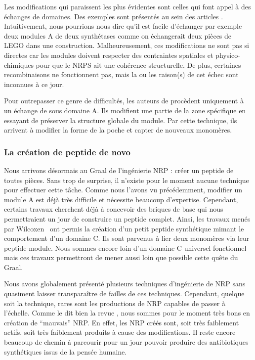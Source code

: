 Les modifications qui paraissent les plus évidentes sont celles qui font appel à des échanges de domaines.
Des exemples sont présentés au sein des articles \cite{cane_harnessing_1998,kim_reinvigorating_2015}.
Intuitivement, nous pourrions nous dire qu'il est facile d'échanger par exemple deux modules A de deux synthétases comme on échangerait deux pièces de LEGO dans une construction.
Malheureusement, ces modifications ne sont pas si directes car les modules doivent respecter des contraintes spatiales et physico-chimiques pour que le NRPS ait une cohérence structurelle.
De plus, certaines recombinaisons ne fonctionnent pas, mais la ou les raison(s) de cet échec sont inconnues à ce jour.


Pour outrepasser ce genre de difficultés, les auteurs de \cite{kries_subdomain_2015} procèdent uniquement à un échange de sous domaine A.
Ils modifient une partie de la zone spécifique en essayant de préserver la structure globale du module.
Par cette technique, ils arrivent à modifier la forme de la poche et capter de nouveaux monomères.


\subsubsection{La création de peptide de novo}

Nous arrivons désormais au Graal de l’ingénierie NRP : créer un peptide de toutes pièces.
Sans trop de surprise, il n'existe pour le moment aucune technique pour effectuer cette tâche.
Comme nous l'avons vu précédemment, modifier un module A est déjà très difficile et nécessite beaucoup d'expertise.
Cependant, certains travaux cherchent déjà à concevoir des briques de base qui nous permettraient un jour de construire un peptide complet.
Ainsi, les travaux menés par Wilcoxen~\cite{wilcoxen_biomimetic_2007} ont permis la création d'un petit peptide synthétique mimant le comportement d'un domaine C.
Ils sont parvenus à lier deux monomères via leur peptide-module.
Nous sommes encore loin d'un domaine C universel fonctionnel mais ces travaux permettront de mener aussi loin que possible cette quête du Graal.


Nous avons globalement présenté plusieurs techniques d'ingénierie de NRP sans quasiment laisser transparaître de failles de ces techniques.
Cependant, quelque soit la technique, rares sont les productions de NRP capables de passer à l'échelle.
Comme le dit bien la revue \cite{kries_biosynthetic_2016}, nous sommes pour le moment très bons en création de ``mauvais'' NRP.
En effet, les NRP créés sont, soit très faiblement actifs, soit très faiblement produits à cause des modifications.
Il reste encore beaucoup de chemin à parcourir pour un jour pouvoir produire des antibiotiques synthétiques issus de la pensée humaine.


